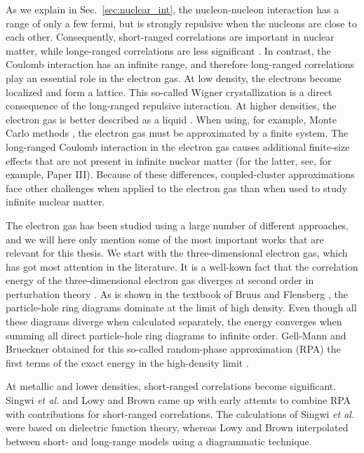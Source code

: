 \documentclass[a4paper,12pt]{report}
\begin{document}
As we explain
in Sec.~\ref{sec:nuclear_int}, the nucleon-nucleon 
interaction has a range of only a few fermi, but is strongly 
repulsive when the nucleons are close to each other. 
Consequently, short-ranged correlations are important in 
nuclear matter, while longe-ranged correlations are less 
significant \cite{dewulf2003}. In contrast, the Coulomb 
interaction has an infinite range, and therefore 
long-ranged correlations play an essential role in the
electron gas. At low density, the electrons become 
localized and form a lattice. This so-called Wigner 
crystallization \cite{wigner1934} is a direct consequence 
of the long-ranged repulsive interaction. At higher
densities, the electron gas is better described as a
liquid \cite{ceperley1978,ceperley1980,
tanatar_ceperley_1989,bishop1982}. 
When using, for example, Monte Carlo methods 
\cite{foulkes2001}, the electron gas must be approximated 
by a finite system. The long-ranged Coulomb interaction 
in the electron gas causes additional finite-size effects 
\cite{fraser1996,chiesa2006,drummond2008} that are not
present in infinite nuclear matter (for the latter, see, 
for example, Paper III). Because of these differences, 
coupled-cluster approximations face other challenges when 
applied to the electron gas than when used to study 
infinite nuclear matter.


The electron gas has been studied using a large number 
of different approaches, and we will here only mention
some of the most important works that are relevant for
this thesis. We start with the three-dimensional electron 
gas, which has got most attention in the literature.
It is a well-kown fact that the correlation energy
of the three-dimensional electron gas diverges 
at second order in perturbation theory \cite{bruus2004}.
As is shown in the textbook of Bruus and Flensberg
\cite{bruus2004}, the particle-hole ring diagrams 
dominate at the limit of high density. Even though
all these diagrams diverge when calculated separately,
the energy converges when summing all direct 
particle-hole ring diagrams to infinite order.
Gell-Mann and Brueckner obtained for this so-called
random-phase approximation (RPA) the first terms of
the exact energy in the high-density limit 
\cite{gellmann1957}. 


At metallic and lower densities, short-ranged correlations
become significant. Singwi \emph{et al.} \cite{singwi1968}
and Lowy and Brown \cite{lowy1975} came up with early attemts 
to combine RPA with contributions for short-ranged 
correlations. The calculations of Singwi \emph{et al.}
were based on dielectric function theory, whereas Lowy and
Brown interpolated between short- and long-range models
using a diagrammatic technique. 
\end{document}

